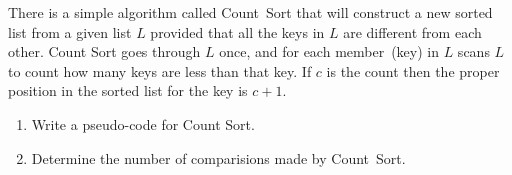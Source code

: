 There is a simple algorithm called Count~Sort that will construct a new
sorted list from a given list $L$ provided that all the keys in $L$ are
different from each other. Count Sort goes through $L$ once, and for
each member~(key)  in $L$ scans $L$ to count how many keys are less than
that key. If $c$ is the count then the proper position in the sorted
list for the key is $c+1$. 
\begin{enumerate}
\item  Write a pseudo-code for Count Sort.
\item  Determine the number of comparisions made by Count~Sort.
\end{enumerate}
